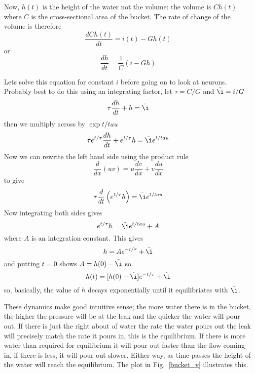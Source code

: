 \documentclass[11pt,a4paper]{scrartcl}
\begin{document}
Now, $h(t)$ is the height of the water not the volume: the volume is
$Ch(t)$ where $C$ is the cross-sectional area of the bucket. The rate
of change of the volume is therefore
\begin{equation}
\frac{dCh(t)}{dt}=i(t)-Gh(t)
\end{equation}
or
\begin{equation}
\frac{dh}{dt}=\frac{1}{C}(i-Gh)
\end{equation}

Lets solve this equation for constant $i$ before going on to look at
neurons. Probably best to do this using an integrating factor, let
$\tau=C/G$ and $\tilde{\i}=i/G$
\begin{equation}
\tau\frac{dh}{dt}+h=\tilde{\i}
\end{equation}
then we multiply across by $\exp{t/tau}$
\begin{equation}
\tau e^{t/\tau}\frac{dh}{dt}+e^{t/\tau}h=\tilde{\i}e^{t/tau}
\end{equation}
Now we can rewrite the left hand side using the product rule
\begin{equation}
\frac{d}{dx}(uv)=u\frac{dv}{dx}+v\frac{du}{dx}
\end{equation}
to give
\begin{equation}
\tau\frac{d}{dt}\left(e^{t/\tau}h\right)=\tilde{\i}e^{t/tau}
\end{equation}
Now integrating both sides gives
\begin{equation}
e^{t/\tau}h=\tilde{\i}e^{t/tau}+A
\end{equation}
where $A$ is an integration constant. This gives
\begin{equation}
h=Ae^{-t/\tau}+\tilde{\i}
\end{equation}
and putting $t=0$ shows $A=h(0)-\tilde{\i}$ so
\begin{equation}
h(t)=[h(0)-\tilde{\i}]e^{-t/\tau}+\tilde{\i}
\end{equation}
so, basically, the value of $h$ decays exponentially until it
equilibriates with $\tilde{\i}$.

These dynamics make good intuitive sense; the more water there is in
the bucket, the higher the pressure will be at the leak and the
quicker the water will pour out. If there is just the right about of
water the rate the water pours out the leak will precisely match the
rate it pours in, this is the equilibrium. If there is more water than
required for equilibrium it will pour out faster than the flow coming
in, if there is less, it will pour out slower. Either way, as time
passes the height of the water will reach the equilibrium. The plot in
Fig.~\ref{bucket_v} illustrates this.
\end{document}
